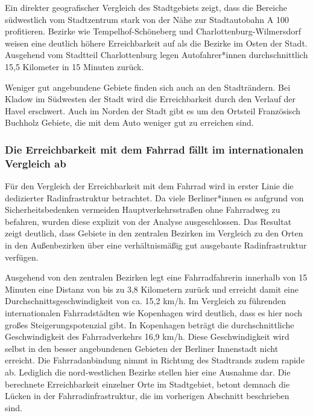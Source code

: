 Ein direkter geografischer Vergleich des Stadtgebiets zeigt, dass die Bereiche südwestlich vom Stadtzentrum stark von der Nähe zur Stadtautobahn A 100 profitieren. Bezirke wie Tempelhof-Schöneberg und Charlottenburg-Wilmersdorf weisen eine deutlich höhere Erreichbarkeit auf als die Bezirke im Osten der Stadt. Ausgehend vom Stadtteil Charlottenburg legen Autofahrer*innen durchschnittlich 15,5 Kilometer in 15 Minuten zurück.

Weniger gut angebundene Gebiete finden sich auch an den Stadträndern. Bei Kladow im Südwesten der Stadt wird die Erreichbarkeit durch den Verlauf der Havel erschwert. Auch im Norden der Stadt gibt es um den Ortsteil Französisch Buchholz Gebiete, die mit dem Auto weniger gut zu erreichen sind.


\subsubsection{Die Erreichbarkeit mit dem Fahrrad fällt im internationalen Vergleich ab}

Für den Vergleich der Erreichbarkeit mit dem Fahrrad wird in erster Linie die dedizierter Radinfrastruktur betrachtet. Da viele Berliner*innen es aufgrund von Sicherheitsbedenken vermeiden Hauptverkehrsstraßen ohne Fahrradweg zu befahren, wurden diese explizit von der Analyse ausgeschlossen. Das Resultat zeigt deutlich, dass Gebiete in den zentralen Bezirken im Vergleich zu den Orten in den Außenbezirken über eine verhältnismäßig gut ausgebaute Radinfrastruktur verfügen.

Ausgehend von den zentralen Bezirken legt eine Fahrradfahrerin innerhalb von 15 Minuten eine Distanz von bis zu 3,8 Kilometern zurück und erreicht damit eine Durchschnittsgeschwindigkeit von ca. 15,2 km/h. Im Vergleich zu führenden internationalen Fahrradstädten wie Kopenhagen wird deutlich, dass es hier noch großes Steigerungspotenzial gibt. In Kopenhagen beträgt die durchschnittliche Geschwindigkeit des Fahrradverkehrs 16,9 km/h.
Diese Geschwindigkeit wird selbst in den besser angebundenen Gebieten der Berliner Innenstadt nicht erreicht. Die Fahrradanbindung nimmt in Richtung des Stadtrands zudem rapide ab. Lediglich die nord-westlichen Bezirke stellen hier eine Ausnahme dar. Die berechnete Erreichbarkeit einzelner Orte im Stadtgebiet, betont demnach die Lücken in der Fahrradinfrastruktur, die im vorherigen Abschnitt beschrieben sind.







